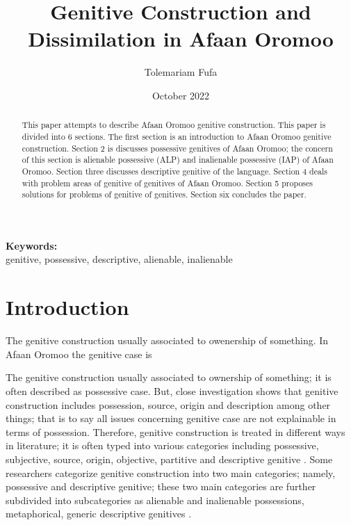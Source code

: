 \documentclass[11pt,a4paper]{article}
\title {Genitive Construction and Dissimilation in Afaan Oromoo}
\author {Tolemariam Fufa}
\date{October 2022}
\begin{document}
	\newcommand\keywords[1]{%
		\begingroup
		\let\and\\
		\par
		\noindent\textbf{Keywords:}\\#1\par
		\endgroup
	}
	\maketitle
	\begin{abstract}
		 
		This paper attempts to describe Afaan Oromoo genitive construction.	This paper is divided into 6 sections. The first section is an introduction to Afaan Oromoo genitive construction. Section 2 is discusses possessive genitives of Afaan Oromoo; the concern of this section is alienable possessive (ALP) and inalienable possessive (IAP) of Afaan Oromoo. Section three discusses descriptive genitive of the language. Section 4 deals with problem areas of genitive of genitives of Afaan Oromoo. Section 5 proposes solutions for problems of genitive of genitives. Section six concludes the paper.
	\end{abstract}
	\keywords{genitive, possessive, descriptive, alienable, inalienable}
	\newpage
	
	\section{Introduction}
	\label{sec:org462cb4a}
	
	The genitive construction usually associated to owenership of something.  In Afaan Oromoo the genitive case is 
	
	
	
	The genitive construction usually associated to ownership of something; it is often described as possessive case. But, close investigation shows that genitive construction includes possession, source, origin and description among other things; that is to say all issues concerning genitive case are not explainable in terms of possession. Therefore, genitive construction is treated in different ways in literature; it is often typed into various categories including possessive, subjective, source, origin, objective, partitive and descriptive genitive \cite{ELTcon}. Some researchers categorize genitive construction into two main categories; namely, possessive and descriptive genitive; these two main categories are further subdivided into subcategories as alienable and inalienable possessions, metaphorical, generic descriptive genitives \cite{rosenbach2006descriptive,gebregziabher2012alienable}. 
	
\end{document}
